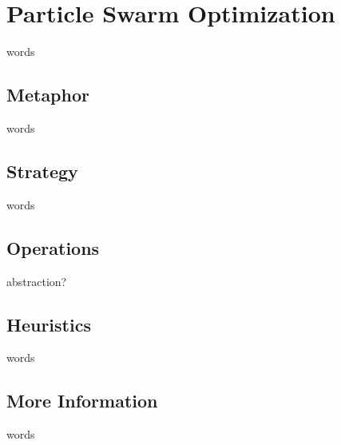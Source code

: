 %
%


%
%
\section{Particle Swarm Optimization}
words


%
%
\subsection{Metaphor}
words

%
%
\subsection{Strategy}
words


%
%
\subsection{Operations}
abstraction?


%
%
\subsection{Heuristics}
words

%
%
\subsection{More Information}
words


